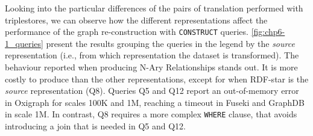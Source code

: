 Looking into the particular differences of the pairs of translation performed with triplestores, we can observe how the different representations affect the performance of the graph re-construction with \texttt{CONSTRUCT} queries. \cref{fig:chp6-1_queries} present the results grouping the queries in the legend by the \textit{source} representation (i.e., from which representation the dataset is transformed). 
The behaviour reported when producing N-Ary Relationships stands out. It is more costly to produce than the other representations, except for when RDF-star is the \textit{source} representation (Q8). Queries Q5 and Q12 report an out-of-memory error in Oxigraph for scales 100K and 1M, reaching a timeout in Fuseki and GraphDB in scale 1M. In contrast, Q8 requires a more complex \texttt{WHERE} clause, that avoids introducing a join that is needed in Q5 and Q12. 



